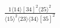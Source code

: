 \documentclass[varwidth, border=5pt]{standalone}
\begin{document}
\begin{my}
$\begin{gathered}
\scriptscriptstyle\frac{1⟨14⟩[34]^2⟨25⟩^2}{⟨15⟩^2⟨23⟩⟨34⟩[35]^2}
\end{gathered}$
\end{my}
\end{document}
